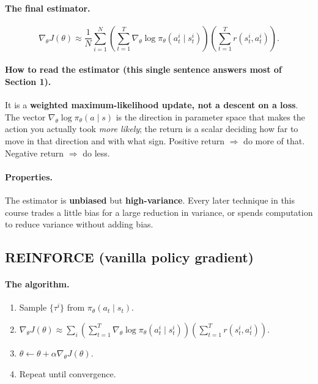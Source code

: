 \documentclass[11pt,a4paper]{article}
\begin{document}
\paragraph{The final estimator.}
\[
\nabla_\theta J(\theta)\approx
\frac1N\sum_{i=1}^N\left(\sum_{t=1}^T \nabla_\theta\log\pi_\theta(a^i_t\mid s^i_t)\right)
\left(\sum_{t=1}^T r(s^i_t,a^i_t)\right).
\]

\paragraph{How to read the estimator (this single sentence answers most of Section 1).}
It is a \textbf{weighted maximum-likelihood update, not a descent on a loss}.
The vector $\nabla_\theta\log\pi_\theta(a\mid s)$ is the direction in
parameter space that makes the action you actually took \emph{more likely};
the return is a scalar deciding how far to move in that direction and with
what sign. Positive return $\Rightarrow$ do more of that. Negative return
$\Rightarrow$ do less.

\paragraph{Properties.} The estimator is \textbf{unbiased} but
\textbf{high-variance}. Every later technique in this course trades a little
bias for a large reduction in variance, or spends computation to reduce
variance without adding bias.

\subsection{REINFORCE (vanilla policy gradient)}

\paragraph{The algorithm.}
\begin{enumerate}[label=\arabic*.]
\item Sample $\{\tau^i\}$ from $\pi_\theta(a_t\mid s_t)$.
\item $\nabla_\theta J(\theta)\approx \sum_i\left(\sum_{t=1}^T\nabla_\theta\log\pi_\theta(a^i_t\mid s^i_t)\right)\left(\sum_{t=1}^T r(s^i_t,a^i_t)\right)$.
\item $\theta \leftarrow \theta+\alpha\nabla_\theta J(\theta)$.
\item Repeat until convergence.
\end{enumerate}
\end{document}
